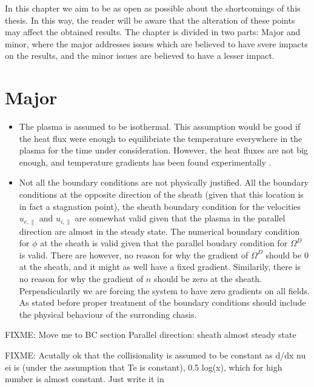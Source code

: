 In this chapter we aim to be as open as possible about the shortcomings of this thesis.
In this way, the reader will be aware that the alteration of these points may affect the obtained results.
The chapter is divided in two parts: Major and minor, where the major addresses issues which are believed to have svere impacts on the results, and the minor issues are believed to have a lesser impact.

\section{Major}
\begin{itemize}[noitemsep,nolistsep]
    \item The plasma is assumed to be isothermal. This assumption would be good
        if the heat flux were enough to equilibriate the temperature
        everywhere in the plasma for the time under consideration.
        However, the heat fluxes are not big enough, and temperature gradients
        has been found experimentally \cite{Schroder2003}.
    \item Not all the boundary conditions are not physically justified. All the
        boundary conditions at the opposite direction of the sheath (given that
        this location is in fact a stagnation point), the sheath boundary
        condition for the velocities $u_{e,\|}$ and $u_{i,\|}$ are somewhat valid
        given that the plasma in the parallel direction are almost in the
        steady state. The numerical boundary condition for $\phi$ at the sheath is valid
        given that the parallel boudary condition for $\Omega^D$ is valid.
        There are however, no reason for why the gradient of $\Omega^D$ should
        be $0$ at the sheath, and it might as well have a fixed gradient.
        Similarily, there is no reason for why the gradient of $n$ should be
        zero at the sheath.
        Perpendicularily we are forcing the system to have zero gradients on
        all fields. As stated before proper treatment of the boundary
        conditions should include the physical behaviour of the surronding
        chasis.
\end{itemize}

FIXME: Move me to BC section
Parallel direction: sheath almost steady state

FIXME: Acutally ok that the collisionality is assumed to be constant as
d/dx nu ei is (under the assumption that Te is constant), 0.5 log(x), which for
high number is almost constant. Just write it in

